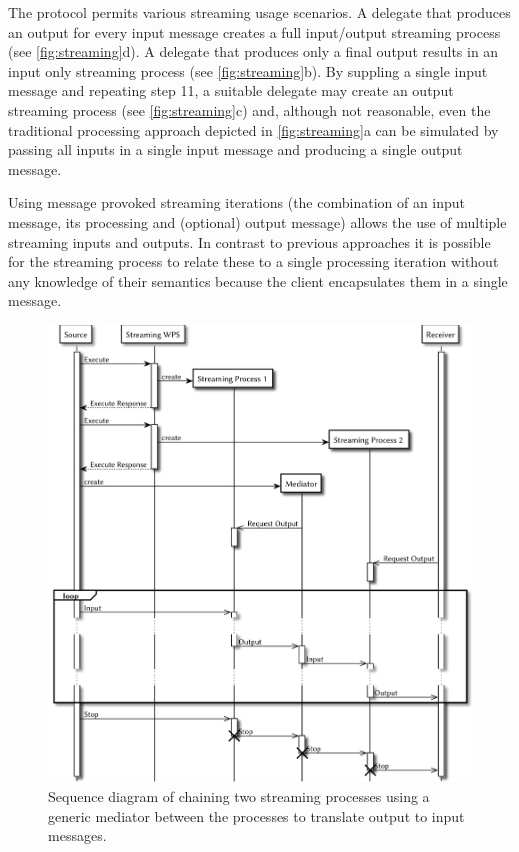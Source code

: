     The protocol permits various streaming usage scenarios. A delegate that produces an output for every input message creates a full input/output streaming process (see \cref{fig:streaming}d). A delegate that produces only a final output results in an input only streaming process (see \cref{fig:streaming}b). By suppling a single input message and repeating step 11, a suitable delegate may create an output streaming process (see \cref{fig:streaming}c) and, although not reasonable, even the traditional processing approach depicted in \cref{fig:streaming}a can be simulated by passing all inputs in a single input message and producing a single output message.

    Using message provoked streaming iterations (the combination of an input message, its processing and (optional) output message) allows the use of multiple streaming inputs and outputs. In contrast to previous approaches it is possible for the streaming process to relate these to a single processing iteration without any knowledge of their semantics because the client encapsulates them in a single message.

    \begin{figure}[!htb]
      \centering
      \includegraphics[width = 1\linewidth]{figures/sequence-diagram-chain.pdf}
      \caption{\label{fig:sd:chain}Sequence diagram of chaining two streaming processes using a generic mediator between the processes to translate output to input messages.}
    \end{figure}

